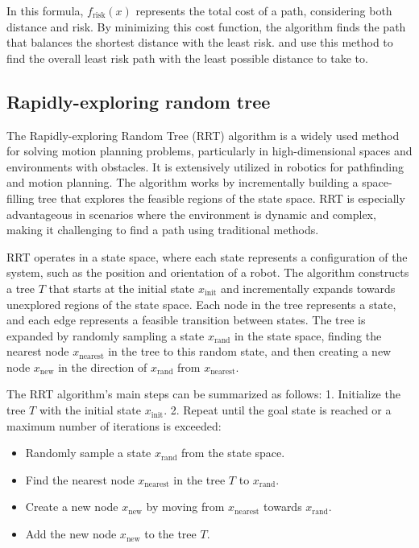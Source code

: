\documentclass[12pt]{report}
\begin{document}
        In this formula, \( f_{\text{risk}}(x) \) represents the total cost of a path, considering both distance and
        risk. By minimizing this cost function, the algorithm finds the path that balances the shortest distance with
        the least risk. \cite{primatesta_ground_2020} and \cite{la_cour-harbo_quantifying_2019} use this method to find
        the overall least risk path with the least possible distance to take to.
        
        \subsection{Rapidly-exploring random tree}
        The Rapidly-exploring Random Tree (RRT) algorithm is a widely used method for solving motion planning problems,
        particularly in high-dimensional spaces and environments with obstacles. It is extensively utilized in robotics
        for pathfinding and motion planning. The algorithm works by incrementally building a space-filling tree that
        explores the feasible regions of the state space. RRT is especially advantageous in scenarios where the
        environment is dynamic and complex, making it challenging to find a path using traditional methods.
            
        RRT operates in a state space, where each state represents a configuration of the system, such as the position
        and orientation of a robot. The algorithm constructs a tree \( T \) that starts at the initial state \(
        x_{\text{init}} \) and incrementally expands towards unexplored regions of the state space. Each node in the
        tree represents a state, and each edge represents a feasible transition between states. The tree is expanded by
        randomly sampling a state \( x_{\text{rand}} \) in the state space, finding the nearest node \(
        x_{\text{nearest}} \) in the tree to this random state, and then creating a new node \( x_{\text{new}} \) in the
        direction of \( x_{\text{rand}} \) from \( x_{\text{nearest}} \).
            
        The RRT algorithm's main steps can be summarized as follows: 1. Initialize the tree \( T \) with the initial
        state \( x_{\text{init}} \). 2. Repeat until the goal state is reached or a maximum number of iterations is
        exceeded:
           \begin{itemize}
             \item Randomly sample a state \( x_{\text{rand}} \) from the state space.
             \item Find the nearest node \( x_{\text{nearest}} \) in the tree \( T \) to \( x_{\text{rand}} \).
             \item Create a new node \( x_{\text{new}} \) by moving from \( x_{\text{nearest}} \) towards \(
             x_{\text{rand}} \).
             \item Add the new node \( x_{\text{new}} \) to the tree \( T \).
           \end{itemize}
       
\end{document}
